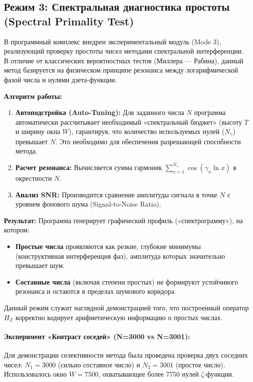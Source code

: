 \documentclass{article}
\numberwithin{equation}{section}
\theoremstyle{plain}
\theoremstyle{definition}
\theoremstyle{remark}
\begin{document}
\subsection*{Режим 3: Спектральная диагностика простоты (Spectral Primality Test)}

В программный комплекс внедрен экспериментальный модуль (Mode 3), реализующий проверку простоты чисел методами спектральной интерференции. В отличие от классических вероятностных тестов (Миллера — Рабина), данный метод базируется на физическом принципе резонанса между логарифмической фазой числа и нулями дзета-функции.

\textbf{Алгоритм работы:}
\begin{enumerate}
    \item \textbf{Автоподстройка (Auto-Tuning):} Для заданного числа $N$ программа автоматически рассчитывает необходимый «спектральный бюджет» (высоту $T$ и ширину окна $W$), гарантируя, что количество используемых нулей ($N_{\gamma}$) превышает $N$. Это необходимо для обеспечения разрешающей способности метода.
    \item \textbf{Расчет резонанса:} Вычисляется сумма гармоник $\sum_{n=1}^{N_{\gamma}} \cos(\gamma_n \ln x)$ в окрестности $N$.
    \item \textbf{Анализ SNR:} Производится сравнение амплитуды сигнала в точке $N$ с уровнем фонового шума (Signal-to-Noise Ratio).
\end{enumerate}

\textbf{Результат:}
Программа генерирует графический профиль («спектрограмму»), на котором:
\begin{itemize}
    \item \textbf{Простые числа} проявляются как резкие, глубокие минимумы (конструктивная интерференция фаз), амплитуда которых значительно превышает шум.
    \item \textbf{Составные числа} (включая степени простых) не формируют устойчивого резонанса и остаются в пределах шумового коридора.
\end{itemize}
Данный режим служит наглядной демонстрацией того, что построенный оператор $H_{\mathbb{Z}}$ корректно кодирует арифметическую информацию о простых числах.

\paragraph{Эксперимент «Контраст соседей» (N=3000 vs N=3001):}
Для демонстрации селективности метода была проведена проверка двух соседних чисел: $N_1 = 3000$ (сильно составное число) и $N_2 = 3001$ (простое число).
Использовалось окно $W=7500$, охватывающее более 7750 нулей $\zeta$-функции.
\end{document}
